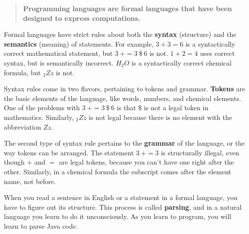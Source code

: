 \begin{quote}
{\bf Programming languages are formal languages that have been designed to express computations.}
\end{quote}


Formal languages have strict rules about both the {\bf syntax} (structure) and the {\bf semantics} (meaning) of statements.
For example, $3 + 3 = 6$ is a syntactically correct mathematical statement, but $3\ + = 3\ \$\ 6$ is not.
$1 + 2 = 4$ uses correct syntax, but is semantically incorrect.
$H_2O$ is a syntactically correct chemical formula, but $_2Zz$ is not.



Syntax rules come in two flavors, pertaining to tokens and grammar.
{\bf Tokens} are the basic elements of the language, like words, numbers, and chemical elements.
One of the problems with $3\ + = 3\ \$\ 6$ is that $\$$ is not a legal token in mathematics.
Similarly, $_2Zz$ is not legal because there is no element with the abbreviation $Zz$.


The second type of syntax rule pertains to the {\bf grammar} of the language, or the way tokens can be arranged.
The statement $3\ + = 3$ is structurally illegal, even though $+$ and $=$ are legal tokens, because you can't have one right after the other.
Similarly, in a chemical formula the subscript comes after the element name, not before.


When you read a sentence in English or a statement in a formal language, you have to figure out its structure.
This process is called {\bf parsing}, and in a natural language you learn to do it unconsciously.
As you learn to program, you will learn to parse Java code.


